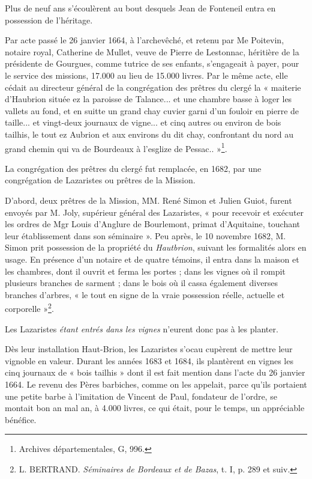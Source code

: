 Plus de neuf ans s'écoulèrent au bout desquels Jean de Fonteneil entra en possession de l'héritage.

Par acte passé le 26 janvier 1664, à l'archevêché, et retenu par Me Poitevin, notaire royal, Catherine de Mullet, veuve de Pierre de Lestonnac, héritière de la présidente de Gourgues, comme tutrice de ses enfants, s'engageait à payer, pour le service des missions, 17.000 au lieu de 15.000 livres. Par le même acte, elle cédait au directeur général de la congrégation des prêtres du clergé la « maiterie d'Haubrion située ez la paroisse de Talance... et une chambre basse à loger les vallets au fond, et en suitte un grand chay cuvier garni d'un fouloir en pierre de taille... et vingt-deux journaux de vigne... et cinq autres ou environ de bois tailhis, le tout ez Aubrion et aux environs du dit chay, confrontant du nord au grand chemin qui va de Bourdeaux à l'esglize de Pessac.. »\footnote{Archives départementales, G, 996.}.

La congrégation des prêtres du clergé fut remplacée, en 1682, par une congrégation de Lazaristes ou prêtres de la Mission.

D'abord, deux prêtres de la Mission, MM. René Simon et Julien Guiot, furent envoyés par M. Joly, supérieur général des Lazaristes, « pour recevoir et exécuter les ordres de Mgr Louis d'Anglure de Bourlemont, primat d'Aquitaine, touchant leur établissement dans son séminaire ». Peu après, le 10 novembre 1682, M. Simon prit possession de la propriété du \textit{Hautbrion}, suivant les formalités alors en usage. En présence d'un notaire et de quatre témoins, il entra dans la maison et les chambres, dont il ouvrit et ferma les portes ; dans les vignes où il rompit plusieurs branches de sarment ; dans le bois où il cassa également diverses branches d'arbres, « le tout en signe de la vraie possession réelle, actuelle et corporelle »\footnote{L. BERTRAND. \textit{Séminaires de Bordeaux et de Bazas}, t. I, p. 289 et suiv.}.

Les Lazaristes \textit{étant entrés dans les vignes} n'eurent donc pas à les planter.

Dès leur installation Haut-Brion, les Lazaristes s'ocau cupèrent de mettre leur vignoble en valeur. Durant les années 1683 et 1684, ils plantèrent en vignes les cinq journaux de « bois tailhis » dont il est fait mention dans l'acte du 26 janvier 1664. Le revenu des Pères barbiches, comme on les appelait, parce qu'ils portaient une petite barbe à l'imitation de Vincent de Paul, fondateur de l'ordre, se montait bon an mal an, à 4.000 livres, ce qui était, pour le temps, un appréciable bénéfice.

